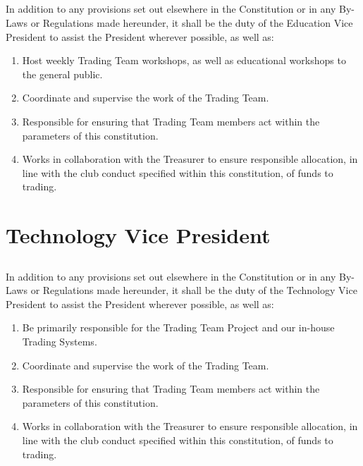 \documentclass[10.5pt]{article}
\begin{document}
\subsection{} In addition to any provisions set out elsewhere in the Constitution or in any By-Laws or Regulations made hereunder, it shall be the duty of the Education Vice President to assist the President wherever possible, as well as:
\begin{enumerate}[label=(\alph*)]
    \item Host weekly Trading Team workshops, as well as educational workshops to the general public.
    \item Coordinate and supervise the work of the Trading Team.
    \item Responsible for ensuring that Trading Team members act within the parameters of this constitution.
    \item Works in collaboration with the Treasurer to ensure responsible allocation, in line with the club conduct specified within this constitution, of funds to trading.
    \newline
\end{enumerate}


\section{Technology Vice President}
\subsection{} In addition to any provisions set out elsewhere in the Constitution or in any By-Laws or Regulations made hereunder, it shall be the duty of the Technology Vice President to assist the President wherever possible, as well as: 
\begin{enumerate}[label=(\alph*)]
    \item Be primarily responsible for the Trading Team Project and our in-house Trading Systems.
    \item Coordinate and supervise the work of the Trading Team.
    \item Responsible for ensuring that Trading Team members act within the parameters of this constitution.
    \item Works in collaboration with the Treasurer to ensure responsible allocation, in line with the club conduct specified within this constitution, of funds to trading.
\newline
\end{enumerate}
\end{document}

